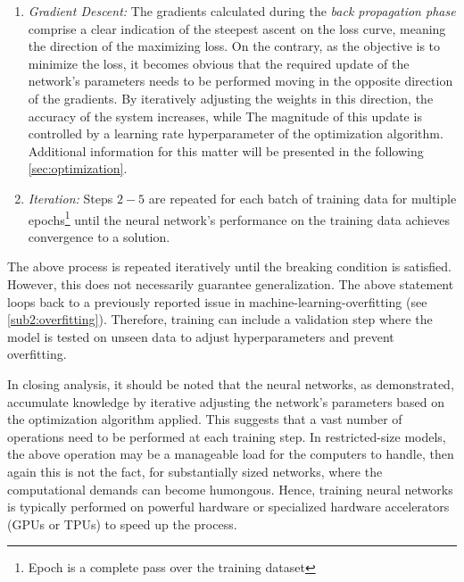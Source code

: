 \begin{enumerate}
    \item \emph{Gradient Descent:} The gradients calculated during the \textit{back propagation phase} comprise a clear indication of the steepest ascent
          on the loss curve, meaning the direction of the maximizing loss. On the contrary, as the objective is to minimize the loss, it becomes obvious that the
          required update of the network’s parameters needs to be performed moving in the opposite direction of the gradients. By iteratively adjusting the weights
          in this direction, the accuracy of the system increases, while The magnitude of this update is controlled by a learning rate hyperparameter of the
          optimization algorithm. Additional information for this matter will be presented in the following \cref{sec:optimization}.

    \item \emph{Iteration:} Steps $2-5$ are repeated for each batch of training data for multiple epochs\footnote{Epoch is a complete pass over the training dataset} until
          the neural network’s performance on the training data achieves convergence to a solution.

\end{enumerate}

The above process is repeated iteratively until the breaking condition is satisfied. However,
this does not necessarily guarantee generalization. The above statement loops back to a previously reported
issue in machine-learning-overfitting (see \cref{sub2:overfitting}). Therefore, training can include a validation
step where the model is tested on unseen data to adjust hyperparameters and prevent overfitting.

In closing analysis, it should be noted that the neural networks, as demonstrated, accumulate knowledge
by iterative adjusting the network's parameters based on the optimization algorithm applied.
This suggests that a vast number of operations need to be performed at each training step.
In restricted-size models, the above operation may be a manageable load for the computers to handle,
then again this is not the fact, for substantially sized networks, where the computational demands can become
humongous. Hence, training neural networks is typically performed on powerful hardware or specialized hardware
accelerators (GPUs or TPUs) to speed up the process\cite{martyNeuralNetworksLearning2023}.

